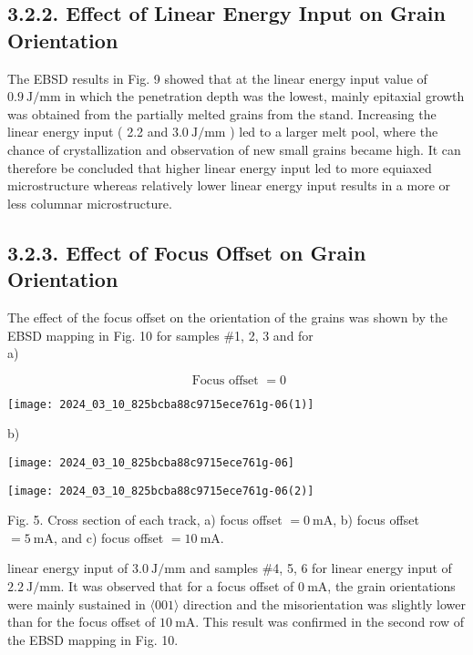 \documentclass[10pt]{article}
\begin{document}
\subsection*{3.2.2. Effect of Linear Energy Input on Grain Orientation}
The EBSD results in Fig. 9 showed that at the linear energy input value of $0.9 \mathrm{~J} / \mathrm{mm}$ in which the penetration depth was the lowest, mainly epitaxial growth was obtained from the partially melted grains from the stand. Increasing the linear energy input ( 2.2 and $3.0 \mathrm{~J} / \mathrm{mm}$ ) led to a larger melt pool, where the chance of crystallization and observation of new small grains became high. It can therefore be concluded that higher linear energy input led to more equiaxed microstructure whereas relatively lower linear energy input results in a more or less columnar microstructure.

\subsection*{3.2.3. Effect of Focus Offset on Grain Orientation}
The effect of the focus offset on the orientation of the grains was shown by the EBSD mapping in Fig. 10 for samples \#1, 2, 3 and for\\
a)

$$
\text { Focus offset }=0
$$

\begin{center}
\texttt{[image: 2024\_03\_10\_825bcba88c9715ece761g-06(1)]}
\end{center}

b)

\begin{center}
\texttt{[image: 2024\_03\_10\_825bcba88c9715ece761g-06]}
\end{center}

\begin{center}
\texttt{[image: 2024\_03\_10\_825bcba88c9715ece761g-06(2)]}
\end{center}

Fig. 5. Cross section of each track, a) focus offset $=0 \mathrm{~mA}$, b) focus offset $=5 \mathrm{~mA}$, and c) focus offset $=10 \mathrm{~mA}$.

linear energy input of $3.0 \mathrm{~J} / \mathrm{mm}$ and samples \#4, 5, 6 for linear energy input of $2.2 \mathrm{~J} / \mathrm{mm}$. It was observed that for a focus offset of $0 \mathrm{~mA}$, the grain orientations were mainly sustained in $\langle 001\rangle$ direction and the misorientation was slightly lower than for the focus offset of $10 \mathrm{~mA}$. This result was confirmed in the second row of the EBSD mapping in Fig. 10.
\end{document}
